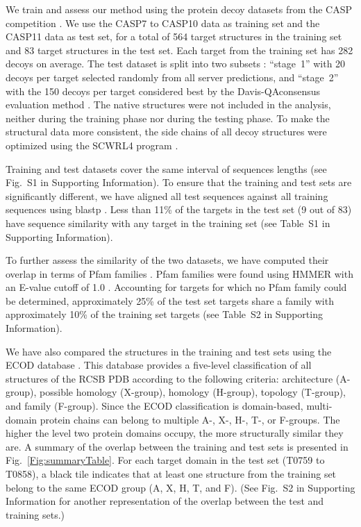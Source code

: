
We train and assess our method using the protein decoy datasets from
the CASP competition \cite{moult2014critical}.  We use the CASP7 to
CASP10 data as training set and the CASP11 data as test set, for a
total of 564 target structures in the training set and 83 target
structures in the test set. Each target from the training set has 282
decoys on average.
%
The test dataset is split into two subsets \cite{kryshtafovych2015}:
``stage~1'' with 20 decoys per target selected randomly from all
server predictions, and ``stage~2'' with the 150 decoys per target
considered best by the Davis-QAconsensus evaluation
method \cite{kryshtafovych2015}.
%
The native structures were not included in the analysis, neither
during the training phase nor during the testing phase. To make the
structural data more consistent, the side chains of all decoy
structures were optimized using the SCWRL4 program
\cite{krivov2009improved}.

Training and test datasets cover the same interval of sequences
lengths (see Fig.~S1 in Supporting Information). To ensure that the
training and test sets are significantly different, we have aligned
all test sequences against all training sequences using
blastp \cite{altschul1990basic}.  Less than 11\% of the targets in the
test set (9 out of 83) have sequence similarity with any target in the
training set (see Table~S1 in Supporting Information).

To further assess the similarity of the two datasets, we have computed
their overlap in terms of Pfam families \cite{finn2016pfam}. Pfam
families were found using HMMER \cite{finn2015hmmer} with an E-value
cutoff of 1.0 \cite{finn2016pfam}.  Accounting for targets for which
no Pfam family could be determined, approximately 25\% of the test set
targets share a family with approximately 10\% of the training set
targets (see Table~S2 in Supporting Information).

We have also compared the structures in the training and test sets
using the ECOD database \cite{cheng2014ecod}. This database provides a
five-level classification of all structures of the RCSB PDB
\cite{berman2000protein} according to the following criteria:
architecture (A-group), possible homology (X-group), homology
(H-group), topology (T-group), and family (F-group).  Since the ECOD
classification is domain-based, multi-domain protein chains can belong
to multiple A-, X-, H-, T-, or F-groups.  The higher the level two
protein domains occupy, the more structurally similar they are.
%
A summary of the overlap between the training and test sets is
presented in Fig.~\ref{Fig:summaryTable}. For each target domain in
the test set (T0759 to T0858), a black tile indicates that at least
one structure from the training set belong to the same ECOD group (A,
X, H, T, and F). (See Fig.~S2 in Supporting Information for another
representation of the overlap between the test and training sets.)

